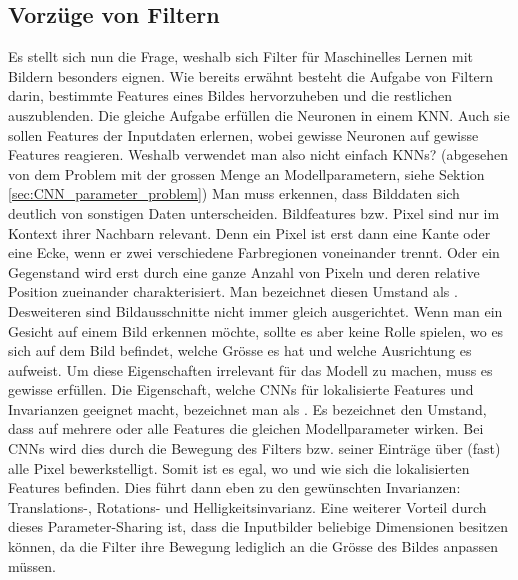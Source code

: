 \subsection{Vorzüge von Filtern}
Es stellt sich nun die Frage, weshalb sich Filter für Maschinelles
Lernen mit Bildern besonders eignen.
Wie bereits erwähnt besteht die Aufgabe von Filtern darin, bestimmte Features
eines Bildes hervorzuheben und die restlichen auszublenden. Die gleiche
Aufgabe erfüllen die Neuronen in einem KNN. Auch sie sollen Features der
Inputdaten erlernen, wobei gewisse Neuronen auf gewisse Features reagieren.
Weshalb verwendet man also nicht einfach KNNs? (abgesehen
von dem Problem mit der grossen Menge an Modellparametern, siehe Sektion \ref{sec:CNN_parameter_problem})
\para{}
Man muss erkennen, dass Bilddaten sich deutlich von sonstigen Daten unterscheiden.
Bildfeatures bzw. Pixel sind nur im Kontext ihrer Nachbarn relevant. Denn
ein Pixel ist erst dann eine Kante oder eine Ecke, wenn er zwei verschiedene
Farbregionen voneinander trennt. Oder ein Gegenstand wird erst durch eine ganze Anzahl
von Pixeln und deren relative Position zueinander charakterisiert.
Man bezeichnet diesen Umstand als .
\para{}
Desweiteren sind Bildausschnitte nicht immer gleich
ausgerichtet. Wenn man ein Gesicht auf einem Bild erkennen möchte, sollte es aber
keine Rolle spielen, wo es sich auf dem Bild befindet, welche Grösse es
hat und welche Ausrichtung es aufweist. Um diese Eigenschaften irrelevant für das
Modell zu machen, muss es gewisse  erfüllen.
\para{}
Die Eigenschaft, welche CNNs für lokalisierte Features und
Invarianzen geeignet macht, bezeichnet man als .
Es bezeichnet den Umstand, dass auf
mehrere oder alle Features die gleichen Modellparameter wirken. Bei CNNs wird
dies durch die Bewegung des Filters bzw. seiner Einträge über (fast) alle
Pixel bewerkstelligt. Somit ist
es egal, wo und wie sich die lokalisierten Features befinden. Dies führt dann eben zu
den gewünschten Invarianzen: Translations-, Rotations- und
Helligkeitsinvarianz.
\para{}
Eine weiterer Vorteil durch dieses Parameter-Sharing ist, dass die Inputbilder
beliebige Dimensionen besitzen können, da die Filter ihre Bewegung lediglich an
die Grösse des Bildes anpassen müssen.
\para{}
\cite{deeplearning.ai:cnn}

